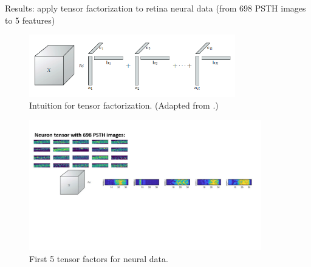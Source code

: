 \documentclass[xcolor={dvipsnames,svgnames}]{beamer}
\begin{document}
\begin{frame}{Results: apply tensor factorization to retina neural data (from 698 PSTH images to 5 features)}
\begin{figure}[H]
        \centering
            \includegraphics[width=0.8\textwidth]{figures-tensor/cp-decomp.png}
            \caption{Intuition for tensor factorization. (Adapted from \cite{Kol2009}.)}
        \end{figure} 
    \begin{figure}[H]
        \centering
            \includegraphics[width=0.9\textwidth]{Slide3.jpg}
            \caption{First 5 tensor factors for neural data.}
        \end{figure} 
        
\end{frame}
\end{document}
